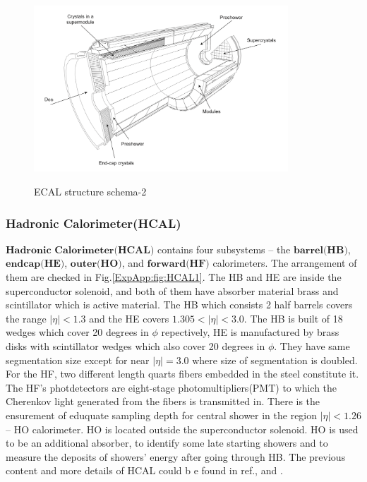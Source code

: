 			\begin{figure}[H]
			\centering{}
		    	\includegraphics[width=0.85\textwidth]{Figures/ExpApparatus/ECAL2.png}\\
			\caption{ECAL structure schema-2\cite{ECAL_ex}}
			\label{ExpApp:fig:ECAL2}
			\end{figure}
			\FloatBarrier

		\subsubsection{Hadronic Calorimeter(HCAL)}
		\label{sssec:hcal}

			$\textbf{Hadronic}$ $\textbf{Calorimeter}$$\textbf{(HCAL)}$ contains four subsystems -- the $\textbf{barrel}$$\textbf{(HB)}$, $\textbf{endcap}$$\textbf{(HE)}$, $\textbf{outer(HO)}$, and $\textbf{forward}$$\textbf{(HF)}$ calorimeters. The arrangement of them are checked in Fig.\ref{ExpApp:fig:HCAL1}. The HB and HE are inside the superconductor solenoid, and both of them have absorber material brass and scintillator which is active material. The HB which consists 2 half barrels covers the range $|\eta| < 1.3$ and the HE covers $1.305 < |\eta| < 3.0$. The HB is built of 18 wedges which cover 20 degrees in $\phi$ repectively, HE is manufactured by brass disks with scintillator wedges which also cover 20 degrees in $\phi$. They have same segmentation size except for near $|\eta| = 3.0$ where size of segmentation is doubled. For the HF, two different length quarts fibers embedded in the steel constitute it. The HF's photdetectors are eight-stage photomultipliers(PMT) to which the Cherenkov light generated from the fibers is transmitted in. There is the ensurement of eduquate sampling depth for central shower in the region $|\eta| < 1.26$ -- HO calorimeter. HO is located outside the superconductor solenoid. HO is used to be an additional absorber, to identify some late starting showers and to measure the deposits of showers' energy after going through HB. The previous content and more details of HCAL could b e found in ref.\cite{Chatrchyan:2008aa},\cite{Canko_ak_2009} and \cite{collaboration_2012}.

